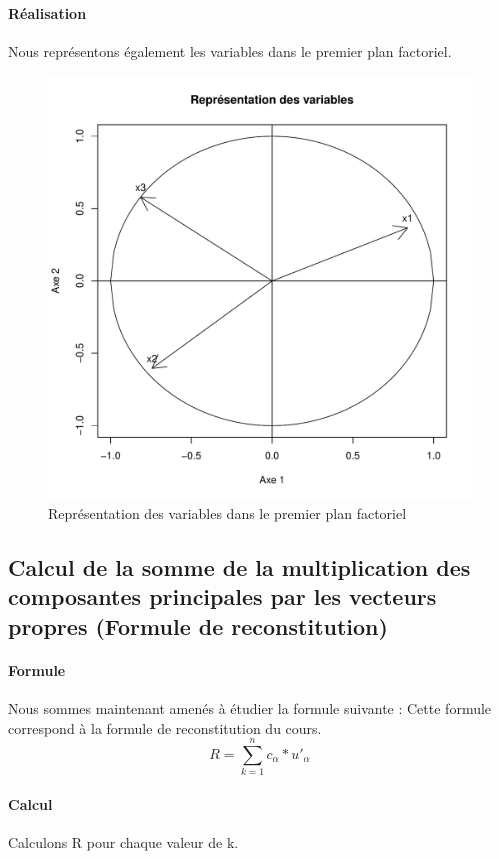 \documentclass{report}
\begin{document}
\paragraph{Réalisation}
Nous représentons également les variables dans le premier plan factoriel.
\begin{figure}[h!]
\begin{center}
    \includegraphics[width=\textwidth]{reprvar.pdf}
    \caption{Représentation des variables dans le premier plan factoriel}
\end{center}
\end{figure}
\subsection{Calcul de la somme de la multiplication des composantes
principales par les vecteurs propres (Formule de reconstitution)}
\paragraph{Formule}
Nous sommes maintenant amenés à étudier la formule suivante :
Cette formule correspond à la formule de reconstitution du cours.
\begin{equation}
R = \sum_{k=1}^n c_\alpha * u'_\alpha
\end{equation}
\paragraph{Calcul}
Calculons R pour chaque valeur de k.
\end{document}
